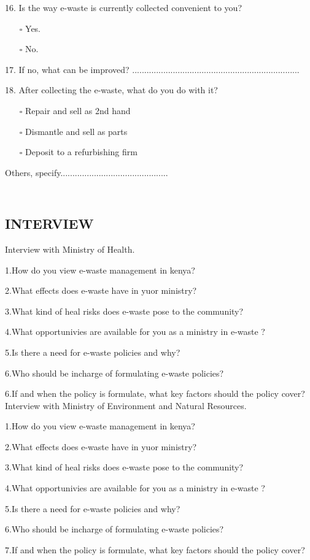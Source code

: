 \documentclass{article}
\begin{document}
16. Is the way e-waste is currently collected convenient to you?
\begin{itemize}
\item[$\square$]Yes.
\item[$\square$] No.
\end{itemize}

17. If no, what can be improved?
......................................................................

18. After collecting the e-waste, what do you do with it?
\begin{itemize}
\item[$\square$]Repair and sell as 2nd hand
\item[$\square$]Dismantle and sell as parts
\item[$\square$]Deposit to a refurbishing firm
\end{itemize}
Others, specify.............................................

\subsection{\\INTERVIEW}
 Interview with Ministry of Health.

1.How do you view e-waste management in kenya?

2.What effects does e-waste have in yuor ministry?

3.What kind of heal risks does e-waste pose to the community?

4.What opportunivies are available for you as a ministry in e-waste ?

5.Is there a need for e-waste policies and why?

6.Who should be incharge of formulating e-waste policies?

6.If and when the policy is formulate, what key factors should the policy cover?
\newline
 Interview with Ministry of Environment and Natural Resources.

1.How do you view e-waste management in kenya?

2.What effects does e-waste have in yuor ministry?

3.What kind of heal risks does e-waste pose to the community?

4.What opportunivies are available for you as a ministry in e-waste ?

5.Is there a need for e-waste policies and why?

6.Who should be incharge of formulating e-waste policies?

7.If and when the policy is formulate, what key factors should the policy cover?


\newpage

\end{document}
